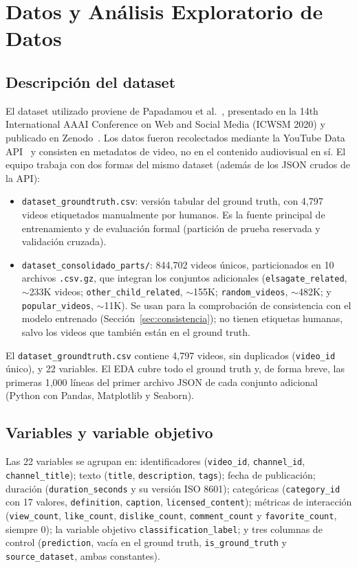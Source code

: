\documentclass[conference]{IEEEtran}
\begin{document}
\section{Datos y Análisis Exploratorio de Datos}

\subsection{Descripción del dataset}\label{sec:desc}
El dataset utilizado proviene de Papadamou et al.~\cite{papadamou}, presentado en la 14th International AAAI Conference on Web and Social Media (ICWSM 2020) y publicado en Zenodo~\cite{papadamou_data}. Los datos fueron recolectados mediante la YouTube Data API~\cite{ytapi} y consisten en metadatos de video, no en el contenido audiovisual en sí. El equipo trabaja con dos formas del mismo dataset (además de los JSON crudos de la API):
\begin{itemize}
\item \texttt{dataset\_groundtruth.csv}: versión tabular del ground truth, con 4,797 videos etiquetados manualmente por humanos. Es la fuente principal de entrenamiento y de evaluación formal (partición de prueba reservada y validación cruzada).
\item \texttt{dataset\_consolidado\_parts/}: 844,702 videos únicos, particionados en 10 archivos \texttt{.csv.gz}, que integran los conjuntos adicionales (\texttt{elsagate\_related}, ${\sim}$233K videos; \texttt{other\_child\_related}, ${\sim}$155K; \texttt{random\_videos}, ${\sim}$482K; y \texttt{popular\_videos}, ${\sim}$11K). Se usan para la comprobación de consistencia con el modelo entrenado (Sección~\ref{sec:consistencia}); no tienen etiquetas humanas, salvo los videos que también están en el ground truth.
\end{itemize}
El \texttt{dataset\_groundtruth.csv} contiene 4,797 videos, sin duplicados (\texttt{video\_id} único), y 22 variables. El EDA cubre todo el ground truth y, de forma breve, las primeras 1,000 líneas del primer archivo JSON de cada conjunto adicional (Python con Pandas, Matplotlib y Seaborn).

\subsection{Variables y variable objetivo}\label{sec:target}
Las 22 variables se agrupan en: identificadores (\texttt{video\_id}, \texttt{channel\_id}, \texttt{channel\_title}); texto (\texttt{title}, \texttt{description}, \texttt{tags}); fecha de publicación; duración (\texttt{duration\_seconds} y su versión ISO 8601); categóricas (\texttt{category\_id} con 17 valores, \texttt{definition}, \texttt{caption}, \texttt{licensed\_content}); métricas de interacción (\texttt{view\_count}, \texttt{like\_count}, \texttt{dislike\_count}, \texttt{comment\_count} y \texttt{favorite\_count}, siempre 0); la variable objetivo \texttt{classification\_label}; y tres columnas de control (\texttt{prediction}, vacía en el ground truth, \texttt{is\_ground\_truth} y \texttt{source\_dataset}, ambas constantes).
\end{document}
